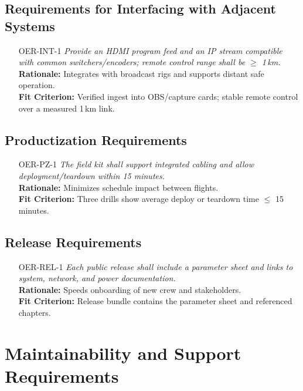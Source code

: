 \documentclass[12pt]{article}
\begin{document}
\subsection{Requirements for Interfacing with Adjacent Systems}
\begin{itemize}[leftmargin=*]
  \item[OER-INT-1] \emph{Provide an HDMI program feed and an IP stream compatible with common switchers/encoders; remote control range shall be $\geq$ 1\,km.}\\
  \textbf{Rationale:} Integrates with broadcast rigs and supports distant safe operation.\\
  \textbf{Fit Criterion:} Verified ingest into OBS/capture cards; stable remote control over a measured 1\,km link.
\end{itemize}

\subsection{Productization Requirements}
\begin{itemize}[leftmargin=*]
  \item[OER-PZ-1] \emph{The field kit shall support integrated cabling and allow deployment/teardown within 15 minutes.}\\
  \textbf{Rationale:} Minimizes schedule impact between flights.\\
  \textbf{Fit Criterion:} Three drills show average deploy or teardown time $\leq$ 15 minutes.
\end{itemize}
\subsection{Release Requirements}
\begin{itemize}[leftmargin=*]
  \item[OER-REL-1] \emph{Each public release shall include a parameter sheet and links to system, network, and power documentation.}\\
  \textbf{Rationale:} Speeds onboarding of new crew and stakeholders.\\
  \textbf{Fit Criterion:} Release bundle contains the parameter sheet and referenced chapters.
\end{itemize}

\section{Maintainability and Support Requirements}
\end{document}
